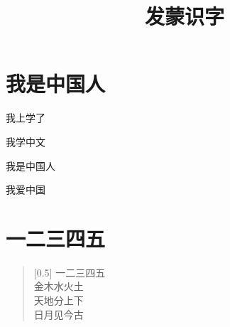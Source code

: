 \documentclass[12pt,UTF-8,openany]{ctexbook}
\title{\zihao{0} \bfseries 发蒙识字}
\author{}
\date{}
\begin{document}
\maketitle
\tableofcontents
\newpage

\chapter{我是中国人}

\begin{large}
    
    我上学了
    
    我学中文
    
    我是中国人
    
    我爱中国
    
\end{large}


\clearpage

\begin{center}
    
\end{center}


\hanzibox{}\hanzibox{}\hanzibox{}\hanzibox{}\hspace{1em}\hanzibox{}\hanzibox{}\hanzibox{}\hanzibox{}

\hanzibox{}\hanzibox{}\hanzibox{}\hanzibox{}\hspace{1em}\hanzibox{}\hanzibox{}\hanzibox{}\hanzibox{}






\chapter{一二三四五}

\begin{large}
    
    \begin{verse}[0.5\linewidth]
        一二三四五 \\
        金木水火土 \\
        天地分上下 \\
        日月见今古
    \end{verse}
    
\end{large}


\clearpage

\begin{center}
    
    
\end{center}
\end{document}
